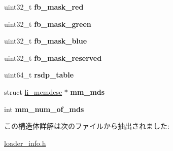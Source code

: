 \begin{DoxyCompactItemize}
\item 
\hypertarget{structloader__info_a699b65d775c00897a31927c193e038bc}{}uint32\+\_\+t {\bfseries fb\+\_\+mask\+\_\+red}\label{structloader__info_a699b65d775c00897a31927c193e038bc}

\item 
\hypertarget{structloader__info_a55cb08c4f4345132e3b672fb04903dfe}{}uint32\+\_\+t {\bfseries fb\+\_\+mask\+\_\+green}\label{structloader__info_a55cb08c4f4345132e3b672fb04903dfe}

\item 
\hypertarget{structloader__info_a1142333f373fbb4bed8cc53f2c9ca5b2}{}uint32\+\_\+t {\bfseries fb\+\_\+mask\+\_\+blue}\label{structloader__info_a1142333f373fbb4bed8cc53f2c9ca5b2}

\item 
\hypertarget{structloader__info_a221a89a8e09e2cf51d5cc94f2a95689e}{}uint32\+\_\+t {\bfseries fb\+\_\+mask\+\_\+reserved}\label{structloader__info_a221a89a8e09e2cf51d5cc94f2a95689e}

\item 
\hypertarget{structloader__info_ac103240162f809d47cf2e0095c9db5f2}{}uint64\+\_\+t {\bfseries rsdp\+\_\+table}\label{structloader__info_ac103240162f809d47cf2e0095c9db5f2}

\item 
\hypertarget{structloader__info_a067e1f0fe32d1ed59fb328c9b5140783}{}struct \hyperlink{structli__memdesc}{li\+\_\+memdesc} $\ast$ {\bfseries mm\+\_\+mds}\label{structloader__info_a067e1f0fe32d1ed59fb328c9b5140783}

\item 
\hypertarget{structloader__info_a3444fcb3cbd4c868754f349b7dfcc5d7}{}int {\bfseries mm\+\_\+num\+\_\+of\+\_\+mds}\label{structloader__info_a3444fcb3cbd4c868754f349b7dfcc5d7}

\end{DoxyCompactItemize}


この構造体詳解は次のファイルから抽出されました\+:\begin{DoxyCompactItemize}
\item 
\hyperlink{loader__info_8h}{loader\+\_\+info.\+h}\end{DoxyCompactItemize}
